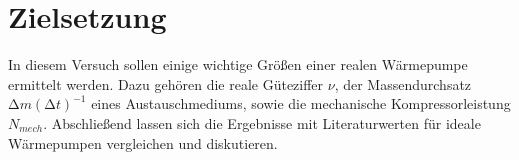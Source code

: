 \section{Zielsetzung}
\label{sec:Zielsetzung}
In diesem Versuch sollen einige wichtige Größen einer realen Wärmepumpe ermittelt werden.
Dazu gehören die reale Güteziffer $\nu$, der Massendurchsatz $\increment m (\increment t)^{-1}$ eines Austauschmediums,
sowie die mechanische Kompressorleistung $N_{mech}$. Abschließend lassen sich die Ergebnisse
mit Literaturwerten für ideale Wärmepumpen vergleichen und diskutieren.
